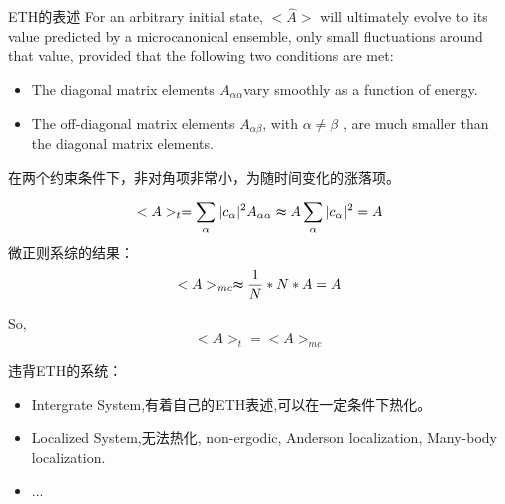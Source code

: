 \documentclass{beamer}
\begin{document}
\begin{frame}{ETH的表述}
\noindent
For an arbitrary initial state,  $<\hat{A}>$ will ultimately evolve to its value predicted by a microcanonical ensemble, only small fluctuations around that value, provided that the following two conditions are met:

\begin{itemize}
\item {The diagonal matrix elements $A_{\alpha \alpha }$vary smoothly as a function of energy.}
\item {The off-diagonal matrix elements $A_{\alpha \beta }$, with $ \alpha \neq \beta$ , are much smaller than the diagonal matrix elements.}
\end{itemize}

\end{frame}

\begin{frame}
在两个约束条件下，非对角项非常小，为随时间变化的涨落项。

$$<A>_t=\sum_{\alpha}|c_{\alpha}|^{2}A_{\alpha \alpha} \thickapprox A\sum_{\alpha}|c_{\alpha}|^{2}=A$$
微正则系综的结果：
$$<A>_{mc}\thickapprox \frac{1}{N}*N*A=A$$

So,
$$<A>_t=<A>_{mc}$$

\end{frame}

\begin{frame}
违背ETH的系统：
\begin{itemize}
    \item Intergrate System,有着自己的ETH表述,可以在一定条件下热化。
    \item Localized System,无法热化, non-ergodic, Anderson localization, Many-body localization.
    \item ...
\end{itemize}
\end{frame}



\end{document}
